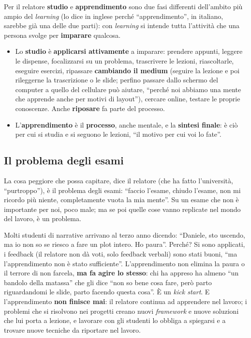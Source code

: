 Per il relatore \textbf{studio} e \textbf{apprendimento} sono due fasi
differenti dell'ambito più ampio del \emph{learning} (lo dice in inglese
perché ``apprendimento'', in italiano, sarebbe già una delle due parti):
con \emph{learning} si intende tutta l'attività che una persona svolge per
\textbf{imparare} qualcosa.
\begin{itemize}
  \item Lo \textbf{studio} è \textbf{applicarsi attivamente} a imparare:
        prendere appunti, leggere le dispense, focalizzarsi su un problema,
        trascrivere le lezioni, riascoltarle, eseguire esercizi, ripassare
        \textbf{cambiando il medium} (seguire la lezione e poi rileggerne
        la trascrizione o le slide; perfino passare dallo schermo del
        computer a quello del cellulare può aiutare, ``perché noi abbiamo
        una mente che apprende anche per motivi di layout''), cercare
        online, testare le proprie conoscenze. Anche \textbf{riposare} fa
        parte del processo.
  \item L'\textbf{apprendimento} è il \textbf{processo}, anche mentale, e
        la \textbf{sintesi finale}: è ciò per cui si studia e si seguono le
        lezioni, ``il motivo per cui voi lo fate''.
\end{itemize}

\subsection{Il problema degli esami}

La cosa peggiore che possa capitare, dice il relatore (che ha fatto
l'università, ``purtroppo''), è il problema degli esami: ``faccio l'esame,
chiudo l'esame, non mi ricordo più niente, completamente vuota la mia
mente''. Su un esame che non è importante per noi, poco male; ma se poi
quelle cose vanno replicate nel mondo del lavoro, è un problema.

Molti studenti di narrative arrivano al terzo anno dicendo: ``Daniele, sto
uscendo, ma io non so se riesco a fare un plot intero. Ho paura''. Perché?
Si sono applicati, i feedback (il relatore non dà voti, solo feedback
verbali) sono stati buoni, ``ma l'apprendimento non è stato sufficiente''.
L'apprendimento non elimina la paura o il terrore di non farcela,
\textbf{ma fa agire lo stesso}: chi ha appreso ha almeno ``un bandolo della
matassa'' che gli dice ``non so bene cosa fare, però parto riguardandomi le
slide, parto facendo questa cosa''. È un \emph{kick start}. E
l'apprendimento \textbf{non finisce mai}: il relatore continua ad
apprendere nel lavoro; i problemi che si risolvono nei progetti creano
nuovi \emph{framework} e nuove soluzioni che lui porta a lezione, e
lavorare con gli studenti lo obbliga a spiegarsi e a trovare nuove tecniche
da riportare nel lavoro.

